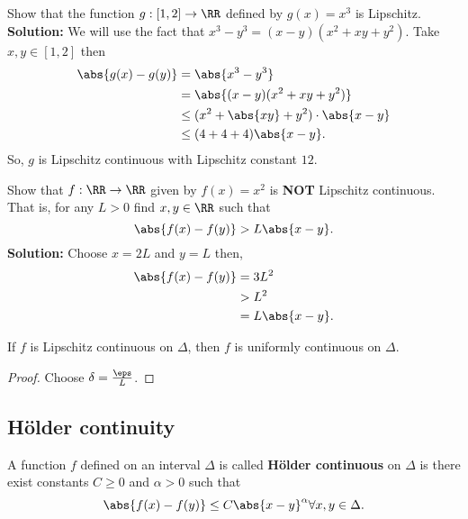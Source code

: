 \documentclass[12pt, a4paper]{article}
\begin{document}
\begin{mdexample}
    Show that the function \(g:[1,2] \to \RR\) defined by \(g(x)=x^3\) is Lipschitz. \\
    \textbf{Solution:} We will use the fact that \(x^3-y^3 = (x-y)(x^2+xy+y^2)\). Take \(x,y \in [1,2]\) then
    \[\begin{aligned}
        \abs{g(x)-g(y)} &= \abs{x^3-y^3} \\
                        &= \abs{(x-y)(x^2+xy+y^2)} \\
                        &\leq (x^2+\abs{xy}+y^2) \cdot \abs{x-y} \\
                        &\leq (4+4+4)\abs{x-y}.
    \end{aligned}\]
    So, \(g\) is Lipschitz continuous with Lipschitz constant \(12\).
\end{mdexample}

\begin{example}
    Show that \(f :\RR \to \RR\) given by \(f(x)=x^2\) is \textbf{NOT} Lipschitz continuous. That is, for any \(L>0\) find \(x,y \in \RR\) such that 
    \[\abs{f(x)-f(y)} > L\abs{x-y}.\]
    \textbf{Solution:} Choose \(x=2L\) and \(y=L\) then,
    \[\begin{aligned}
        \abs{f(x)-f(y)} &= 3L^2 \\
                        &> L^2 \\
                        &= L\abs{x-y}.
    \end{aligned}\] 
\end{example}

\begin{theorem}
    If \(f\) is Lipschitz continuous on \(\Delta\), then \(f\) is uniformly continuous on \(\Delta\).
\end{theorem}

\begin{proof}
    Choose \(\delta = \frac{\eps}{L}\).
\end{proof}

\subsection{Hölder continuity}

\begin{definition}
    A function \(f\) defined on an interval \(\Delta\) is called \textbf{Hölder continuous} on \(\Delta\) is there exist constants \(C \geq 0\) and \(\alpha>0\) such that 
    \[\abs{f(x)-f(y)} \leq C \abs{x-y}^{\alpha} \forall x,y \in \Delta.\]
\end{definition}
\end{document}
